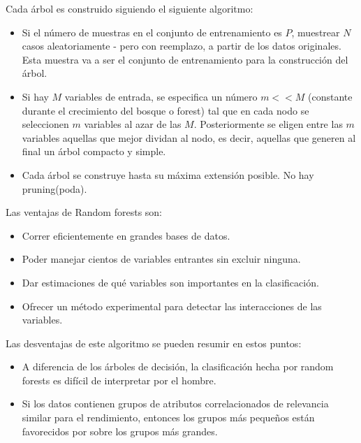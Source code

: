 	Cada árbol es construido siguiendo el siguiente algoritmo:
	\begin{itemize}
		\item Si el número de muestras en el conjunto de entrenamiento es $P$, muestrear $N$ casos aleatoriamente - pero con reemplazo, a partir de los datos originales. Esta muestra va a ser el conjunto de entrenamiento para la construcción del árbol.
		\item Si hay $M$ variables de entrada, se especifica un número $m<<M$ (constante durante el crecimiento del bosque o forest) tal que en cada nodo se seleccionen $m$ variables al azar de las $M$. Posteriormente se eligen entre las $m$ variables aquellas que mejor dividan al nodo, es decir, aquellas que generen al final un árbol compacto y simple.
		\item Cada árbol se construye hasta su máxima extensión posible. No hay pruning(poda).
	\end{itemize}
	Las ventajas de Random forests son:
	\begin{itemize}
		\item Correr eficientemente en grandes bases de datos.
		\item Poder manejar cientos de variables entrantes sin excluir ninguna.
		\item Dar estimaciones de qué variables son importantes en la clasificación.
		\item Ofrecer un método experimental para detectar las interacciones de las variables.
	\end{itemize}
	Las desventajas de este algoritmo se pueden resumir en estos puntos:
	\begin{itemize}
		\item A diferencia de los árboles de decisión, la clasificación hecha por random forests es difícil de interpretar por el hombre.
		\item Si los datos contienen grupos de atributos correlacionados de relevancia similar para el rendimiento, entonces los grupos más pequeños están favorecidos por sobre los grupos más grandes.
	\end{itemize}
	
